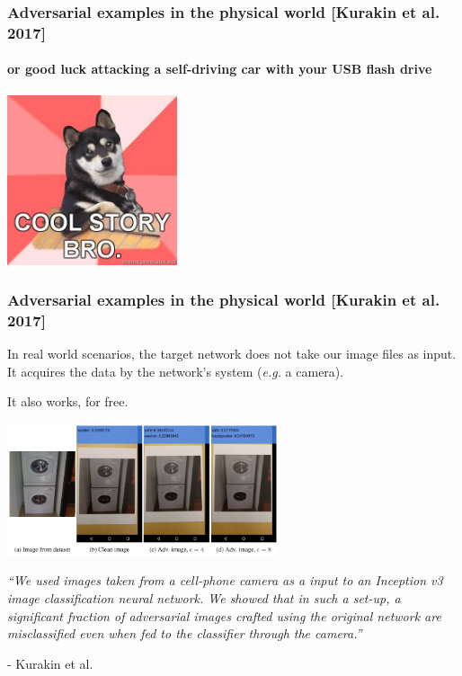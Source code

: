 \documentclass[9pt]{beamer}
\begin{document}
\begin{frame}
  \frametitle{Adversarial examples in the physical world [Kurakin et
      al. 2017]}

  \framesubtitle{or good luck attacking a self-driving car with
    your USB flash drive}

  \begin{center}
    \includegraphics[width = 5cm]{images/cool_story_bro_2.jpg}
  \end{center}

\end{frame}

\begin{frame}
  \frametitle{Adversarial examples in the physical world [Kurakin et
      al. 2017]}

  In real world scenarios, the target network does not take our image
  files as input. It acquires the data by the network's system
  (\textit{e.g.} a camera).

  \medskip

  It also works, for free.

  \begin{center}
    \includegraphics[width = 8cm]{images/physical_adversarial_sample.png}
  \end{center}


  \textit{``We used images taken from a cell-phone camera as a input
    to an Inception v3 image classification neural network. We showed
    that in such a set-up, a significant fraction of adversarial
    images crafted using the original network are misclassified even
    when fed to the classifier through the camera.''}

  \smallskip

  - Kurakin et al.

\end{frame}
\end{document}
